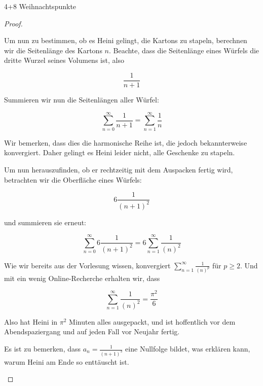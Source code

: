\documentclass{../problemset}
\begin{document}
\begin{problem}[Weihnachtsaufgaben*]{4+8 Weihnachtspunkte}
\begin{proof}
\begin{enumerate}
		      Um nun zu bestimmen, ob es Heini gelingt, die Kartons zu stapeln, berechnen wir
		      die Seitenlänge des Kartons $n$. Beachte, dass die Seitenlänge eines Würfels
		      die dritte Wurzel seines Volumens ist, also

		      \[
			      \frac{1}{n+1}
		      \]

		      Summieren wir nun die Seitenlängen aller Würfel:

		      \[
			      \sum_{n=0}^{\infty} \frac{1}{n+1} = \sum_{n=1}^{\infty} \frac{1}{n}
		      \]

		      Wir bemerken, dass dies die harmonische Reihe ist, die jedoch bekannterweise
		      konvergiert. Daher gelingt es Heini leider nicht, alle Geschenke zu stapeln.

		      Um nun herauszufinden, ob er rechtzeitig mit dem Auspacken fertig wird,
		      betrachten wir die Oberfläche eines Würfels:

		      \[
			      6 \frac{1}{{(n+1)}^2}
		      \]

		      und summieren sie erneut:

		      \[
			      \sum_{n=0}^{\infty} 6 \frac{1}{{(n+1)}^2} = 6 \sum_{n=1}^{\infty} \frac{1}{{(n)}^2}
		      \]

		      Wie wir bereits aus der Vorlesung wissen, konvergiert $\sum_{n=1}^{\infty}
			      \frac{1}{{(n)}^p}$ für $p \ge 2$. Und mit ein wenig Online-Recherche erhalten
		      wir, dass

		      \[
			      \sum_{n=1}^{\infty} \frac{1}{{(n)}^2} = \frac{\pi^2}{6}
		      \]

		      Also hat Heini in $\pi^2$ Minuten alles ausgepackt, und ist hoffentlich vor dem
		      Abendspaziergang und auf jeden Fall vor Neujahr fertig.

		      Es ist zu bemerken, dass $a_n = \frac{1}{{(n+1)}^3}$ eine Nullfolge bildet, was
		      erklären kann, warum Heini am Ende so enttäuscht ist.

	\end{enumerate}

\end{proof}
\end{problem}
\end{document}
